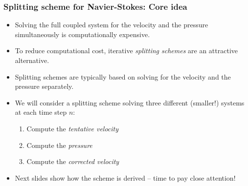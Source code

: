 \begin{frame}
  \frametitle{Splitting scheme for Navier-Stokes: Core idea}
  \begin{itemize}
  \item
    Solving the full coupled system for the velocity and the pressure
    simultaneously is computationally expensive.
  \item
    To reduce computational cost, iterative \emph{splitting schemes}
    are an attractive alternative.
  \item
    Splitting schemes are typically based on solving for the velocity
    and the pressure separately.
  \item
    We will consider a splitting scheme solving three different
    (smaller!) systems at each time step $n$:
    \begin{enumerate}
    \item
      Compute the \emph{tentative velocity}
    \item
      Compute the \emph{pressure}
    \item
      Compute the \emph{corrected velocity}
    \end{enumerate}
  \item
    Next slides show how the scheme is derived -- time to pay close attention!
  \end{itemize}
\end{frame}
